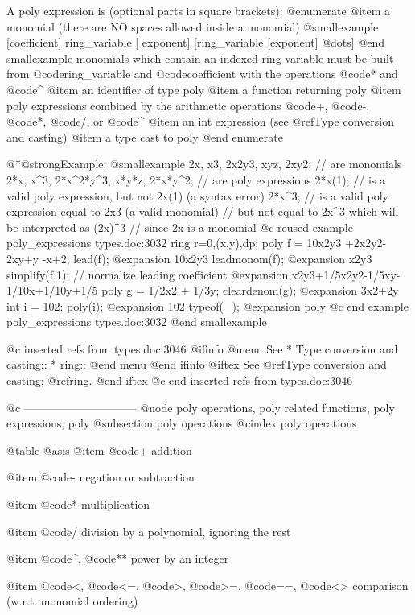 {{{{{{A poly expression is (optional parts in square brackets):
@enumerate
@item
a monomial (there are NO spaces allowed inside a monomial)
@smallexample
  [coefficient] ring_variable [ exponent] [ring_variable [exponent] @dots{}]
@end smallexample
monomials which contain an indexed ring variable
must be built from @code{ring_variable} and @code{coefficient}
with the operations @code{*} and @code{^}
@item
an identifier of type poly
@item
a function returning poly
@item
poly expressions combined by the arithmetic operations
@code{+}, @code{-}, @code{*}, @code{/}, or @code{^}
@item
an int expression (see @ref{Type conversion and casting})
@item
a type cast to poly
@end enumerate

@*@strong{Example:}
@smallexample
2x, x3, 2x2y3, xyz, 2xy2; //  are monomials
2*x, x^3, 2*x^2*y^3, x*y*z, 2*x*y^2; // are poly expressions
2*x(1); // is a valid poly expression, but not 2x(1) (a syntax error)
2*x^3;  // is a valid poly expression equal to 2x3 (a valid monomial)
        // but not equal to 2x^3 which will be interpreted as (2x)^3
        // since 2x is a monomial
@c reused example poly_expressions types.doc:3032 
  ring r=0,(x,y),dp;
  poly f = 10x2y3 +2x2y2-2xy+y -x+2;
  lead(f);
@expansion{} 10x2y3
  leadmonom(f);
@expansion{} x2y3
  simplify(f,1);     // normalize leading coefficient
@expansion{} x2y3+1/5x2y2-1/5xy-1/10x+1/10y+1/5
  poly g = 1/2x2 + 1/3y;
  cleardenom(g);
@expansion{} 3x2+2y
  int i = 102;
  poly(i);
@expansion{} 102
  typeof(_);
@expansion{} poly
@c end example poly_expressions types.doc:3032
@end smallexample

@c inserted refs from types.doc:3046
@ifinfo
@menu
See 
* Type conversion and casting::
* ring::
@end menu
@end ifinfo
@iftex
See 
@ref{Type conversion and casting};
@ref{ring}.
@end iftex
@c end inserted refs from types.doc:3046

@c ------------------------------
@node poly operations, poly related functions, poly expressions, poly
@subsection poly operations
@cindex poly operations

@table @asis
@item @code{+}
addition

@item @code{-}
negation or subtraction

@item @code{*}
multiplication

@item @code{/}
division by a polynomial, ignoring the rest

@item @code{^}, @code{**}
power by an integer

@item @code{<}, @code{<=}, @code{>}, @code{>=}, @code{==}, @code{<>}
comparison (w.r.t. monomial ordering)

}}}}}}
